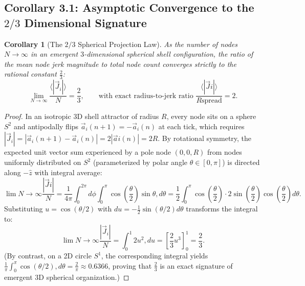 \documentclass[11pt,a4paper]{article}
\theoremstyle{plain}
\newtheorem{corollary}{Corollary}[theorem]
\theoremstyle{definition}
\theoremstyle{remark}
\begin{document}
\subsection{Corollary 3.1: Asymptotic Convergence to the $2/3$ Dimensional Signature}
\begin{corollary}[The $2/3$ Spherical Projection Law]
\label{cor:two_thirds}
As the number of nodes $N \to \infty$ in an emergent $3$-dimensional spherical shell configuration, the ratio of the mean node jerk magnitude to total node count converges strictly to the rational constant $\frac{2}{3}$:
\begin{equation}
\lim_{N \to \infty} \frac{\langle |\vec{J}_i| \rangle}{N} = \frac{2}{3}, \qquad \text{with exact radius-to-jerk ratio } \frac{\langle |\vec{J}i| \rangle}{R{\mathrm{spread}}} = 2.
\end{equation}
\end{corollary}
\begin{proof}
In an isotropic 3D shell attractor of radius $R$, every node sits on a sphere $S^2$ and antipodally flips $\vec{a}_i(n+1) = -\vec{a}_i(n)$ at each tick, which requires $|\vec{J}_i| = |\vec{a}_i(n+1) - \vec{a}_i(n)| = 2|\vec{a}i(n)| = 2R$. By rotational symmetry, the expected unit vector sum experienced by a pole node $(0,0,R)$ from nodes uniformly distributed on $S^2$ (parameterized by polar angle $\theta \in [0,\pi]$) is directed along $-\hat{z}$ with integral average:
\begin{equation}
\lim{N \to \infty} \frac{|\vec{J}i|}{N} = \frac{1}{4\pi} \int_0^{2\pi} d\phi \int_0^\pi \cos\left(\frac{\theta}{2}\right) \sin\theta , d\theta = \frac{1}{2} \int_0^\pi \cos\left(\frac{\theta}{2}\right) \cdot 2\sin\left(\frac{\theta}{2}\right)\cos\left(\frac{\theta}{2}\right) d\theta.
\end{equation}
Substituting $u = \cos(\theta/2)$ with $du = -\frac{1}{2}\sin(\theta/2)d\theta$ transforms the integral to:
\begin{equation}
\lim{N \to \infty} \frac{|\vec{J}_i|}{N} = \int_0^1 2 u^2 , du = \left[ \frac{2}{3} u^3 \right]_0^1 = \frac{2}{3}.
\end{equation}
(By contrast, on a 2D circle $S^1$, the corresponding integral yields $\frac{1}{\pi}\int_0^\pi \cos(\theta/2),d\theta = \frac{2}{\pi} \approx 0.6366$, proving that $\frac{2}{3}$ is an exact signature of emergent 3D spherical organization.)
\end{proof}
\end{document}
